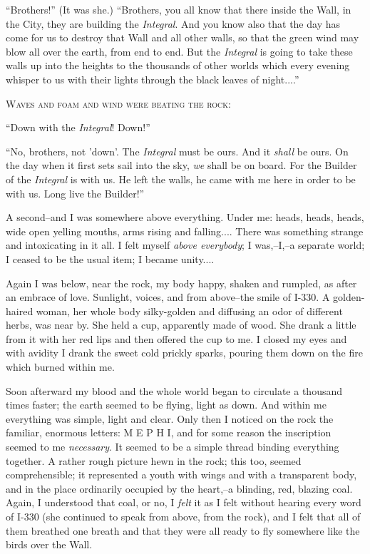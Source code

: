 \documentclass[11pt,openany]{book}
\begin{document}
``Brothers!'' (It was she.) ``Brothers, you all know that there inside the Wall, in the City, they are building the \emph{Integral}. And you know also that the day has come for us to destroy that Wall and all other walls, so that the green wind may blow all over the earth, from end to end. But the \emph{Integral} is going to take these walls up into the heights to the thousands of other worlds which every evening whisper to us with their lights through the black leaves of night....''

\begin{center}\textsc{Waves and foam and wind were beating the rock:}\end{center}

``Down with the \emph{Integral}! Down!''

``No, brothers, not 'down'. The \emph{Integral} must be ours. And it \emph{shall} be ours. On the day when it first sets sail into the sky, \emph{we} shall be on board. For the Builder of the \emph{Integral} is with us. He left the walls, he came with me here in order to be with us. Long live the Builder!''

A second--and I was somewhere above everything. Under me: heads, heads, heads, wide open yelling mouths, arms rising and falling.... There was something strange and intoxicating in it all. I felt myself \emph{above everybody}; I was,--I,--a separate world; I ceased to be the usual item; I became unity....

Again I was below, near the rock, my body happy, shaken and rumpled, as after an embrace of love. Sunlight, voices, and from above--the smile of I-330. A golden-haired woman, her whole body silky-golden and diffusing an odor of different herbs, was near by. She held a cup, apparently made of wood. She drank a little from it with her red lips and then offered the cup to me. I closed my eyes and with avidity I drank the sweet cold prickly sparks, pouring them down on the fire which burned within me.

Soon afterward my blood and the whole world began to circulate a thousand times faster; the earth seemed to be flying, light as down. And within me everything was simple, light and clear. Only then I noticed on the rock the familiar, enormous letters: M E P H I, and for some reason the inscription seemed to me \emph{necessary}. It seemed to be a simple thread binding everything together. A rather rough picture hewn in the rock; this too, seemed comprehensible; it represented a youth with wings and with a transparent body, and in the place ordinarily occupied by the heart,--a blinding, red, blazing coal. Again, I understood that coal, or no, I \emph{felt} it as I felt without hearing every word of I-330 (she continued to speak from above, from the rock), and I felt that all of them breathed one breath and that they were all ready to fly somewhere like the birds over the Wall.
\end{document}
